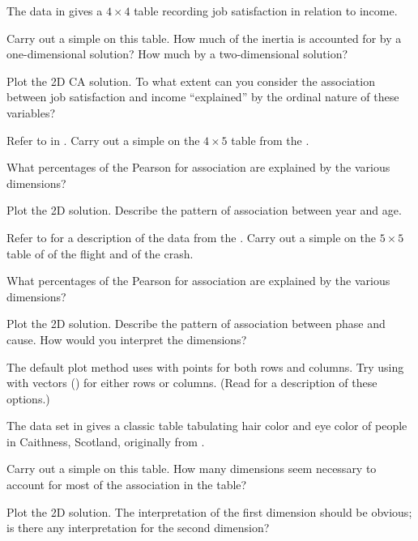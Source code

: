 \documentclass[11pt]{report}\usepackage[]{graphicx}\usepackage[]{color}
\begin{document}
\begin{Exercises}

  \exercise The  data in  gives a $4 \times 4$ table recording job satisfaction
  in relation to income.
  \begin{enumerate*}
    \item  Carry out a simple \ca on this table.  How much of the inertia is accounted for by a
    one-dimensional solution?  How much by a two-dimensional solution?
    \item Plot the 2D CA solution.  To what extent can you consider the association between
    job satisfaction and income ``explained'' by the ordinal nature of these variables?
  \end{enumerate*}
  
  \exercise Refer to  in .  Carry out a simple \ca on the
  $4 \times 5$ table  from the .
  \begin{enumerate*}
    \item What percentages of the Pearson \chisq for association are explained
    by the various dimensions?
    \item Plot the 2D \ca solution. Describe the pattern of association between
    year and age.
  \end{enumerate*}
  
  \exercise\label{lab:ca-crash} Refer to  for a description of the  data from the .
  Carry out a simple \ca on the $5 \times 5$ table of  of the flight and  of the crash.
  \begin{enumerate*}
    \item What percentages of the Pearson \chisq for association are explained
    by the various dimensions?
    \item Plot the 2D \ca solution. Describe the pattern of association between
    phase and cause.  How would you interpret the dimensions?
    \item The default plot method uses  with points for both rows and columns.
    Try using  with vectors () for either rows or columns.
    (Read  for a description of these options.)
  \end{enumerate*}
  
  \exercise The data set  in  gives a classic table 
  tabulating hair color and eye color 
  of people in Caithness, Scotland, originally from
  \citet{Fisher:1940}.
  \begin{enumerate*}
    \item Carry out a simple \ca on this table.  How many dimensions
    seem necessary to account for most of the association in the table?
    \item Plot the 2D solution. The interpretation of the first dimension
    should be obvious; is there any interpretation for the second dimension?
  \end{enumerate*}
  

\end{Exercises}
\end{document}
